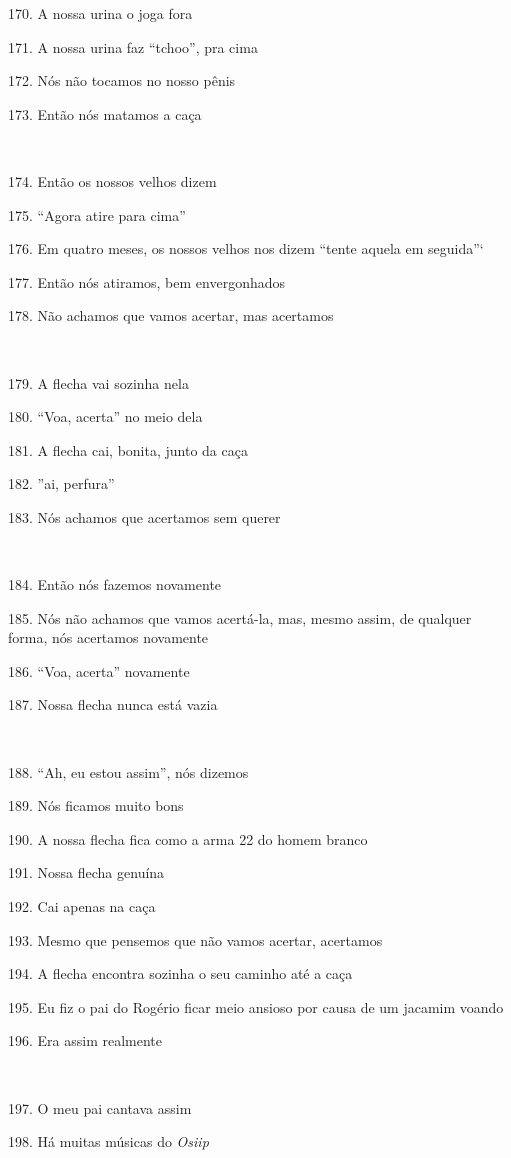 170. A nossa urina o joga fora

171. A nossa urina faz ``tchoo'', pra cima

172. Nós não tocamos no nosso pênis

173. Então nós matamos a caça

~

174. Então os nossos velhos dizem

175. ``Agora atire para cima''

176. Em quatro meses, os nossos velhos nos dizem ``tente aquela em
seguida''`

177. Então nós atiramos, bem envergonhados

178. Não achamos que vamos acertar, mas acertamos

~

179. A flecha vai sozinha nela

180. ``Voa, acerta'' no meio dela

181. A flecha cai, bonita, junto da caça

182. ''ai, perfura''

183. Nós achamos que acertamos sem querer

~

184. Então nós fazemos novamente

185. Nós não achamos que vamos acertá-la, mas, mesmo assim, de qualquer
forma, nós acertamos novamente

186. ``Voa, acerta'' novamente

187. Nossa flecha nunca está vazia

~

188. ``Ah, eu estou assim'', nós dizemos

189. Nós ficamos muito bons

190. A nossa flecha fica como a arma 22 do homem branco

191. Nossa flecha genuína

192. Cai apenas na caça

193. Mesmo que pensemos que não vamos acertar, acertamos

194. A flecha encontra sozinha o seu caminho até a caça

195. Eu fiz o pai do Rogério ficar meio ansioso por causa de um jacamim
voando

196. Era assim realmente

~

197. O meu pai cantava assim

198. Há muitas músicas do \emph{Osiip}

